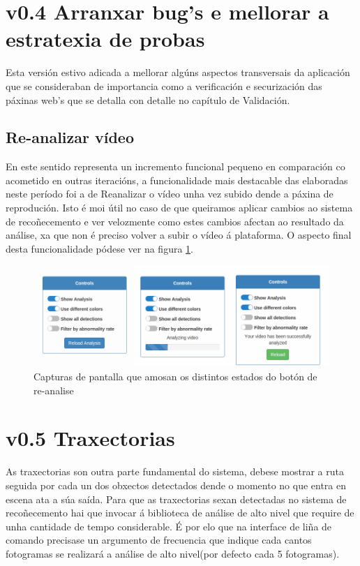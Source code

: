 \section{v0.4 Arranxar bug's e mellorar a estratexia de probas}
    
    Esta versión estivo adicada a mellorar algúns aspectos transversais da aplicación que se 
    consideraban de importancia como a verificación e securización das páxinas web's que se detalla 
    con detalle no capítulo de Validación.
    
    \subsection{Re-analizar vídeo}
    En este sentido representa un incremento funcional 
        pequeno en comparación co acometido en outras iteracións, a funcionalidade mais destacable
        das elaboradas neste período foi a de Reanalizar o vídeo unha vez subido dende a páxina de 
        reprodución. Isto é moi útil no caso de que queiramos aplicar cambios ao sistema de 
        recoñecemento e ver velozmente como estes cambios afectan ao resultado da análise, xa que non é
        preciso volver a subir o vídeo á plataforma. O aspecto final desta funcionalidade pódese 
        ver na figura \ref{fig:reloadAnalysis}.
    
        \begin{figure}[htp]
        \begin{center}
            \includegraphics[scale=0.45]{figures/reloadAnalysis.png}
            \caption{Capturas de pantalla que amosan os distintos estados do botón de re-analise}
        \label{fig:reloadAnalysis}
        \end{center}
        \end{figure}

\section{v0.5 Traxectorias}
    As traxectorias son outra parte fundamental do sistema, debese mostrar a ruta seguida por 
    cada un dos obxectos detectados dende o momento no que entra en escena ata a súa saída. Para 
    que as traxectorias sexan detectadas no sistema de recoñecemento hai que invocar á biblioteca 
    de análise de alto nivel que require de unha cantidade de tempo considerable. É por elo que na 
    interface de liña de comando precisase un argumento de frecuencia que indique cada cantos 
    fotogramas se realizará a análise de alto nivel(por defecto cada 5 fotogramas).
    
